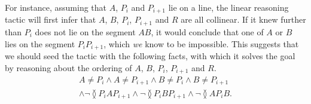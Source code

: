 For instance, assuming that $A$, $P_i$ and $P_{i+1}$ lie on a line, the linear reasoning tactic will first infer that $A$, $B$, $P_i$, $P_{i+1}$ and $R$ are all collinear. If it knew further than $P_{i}$ does not lie on the segment $AB$, it would conclude that one of $A$ or $B$ lies on the segment $P_iP_{i+1}$, which \emph{we} know to be impossible. This suggests that we should seed the tactic with the following facts, with which it solves the goal by reasoning about the ordering of $A$, $B$, $P_i$, $P_{i+1}$ and $R$.
\begin{multline*}
A \neq P_i \wedge A \neq P_{i+1} \wedge B \neq P_i \wedge B \neq P_{i+1}\\ \wedge \neg\between{P_i}{A}{P_{i+1}} \wedge \neg\between{P_i}{B}{P_{i+1}} \wedge \neg\between{A}{P_i}{B}.
\end{multline*}


